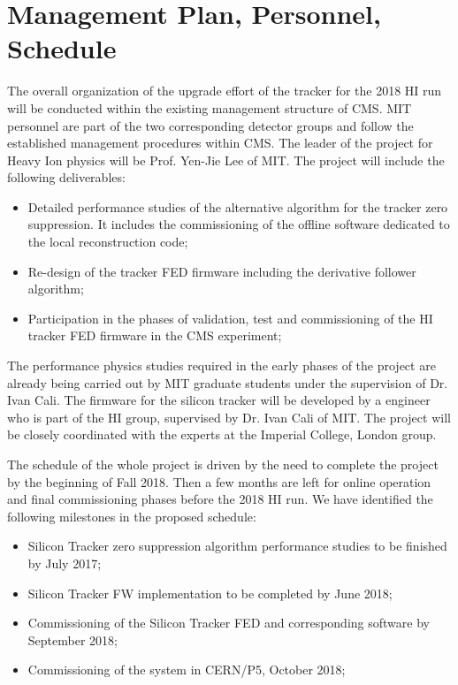 \section{Management Plan, Personnel, Schedule}
\label{sec:management}

The overall organization of the upgrade effort of the tracker%
for the 2018 HI run will be conducted within the existing management structure of CMS. MIT personnel are part of the two corresponding detector groups and follow the established management procedures within CMS. The leader of the project for Heavy Ion physics will be Prof. Yen-Jie Lee of MIT. The project will include the following deliverables:

\begin{itemize}
\item Detailed performance studies of the alternative algorithm for the tracker zero suppression. It includes the commissioning of the offline software dedicated to the local reconstruction code;
\item Re-design of the tracker FED firmware including the derivative follower algorithm;
\item Participation in the phases of validation, test and commissioning of the HI tracker FED firmware in the CMS experiment;
\end{itemize}

The performance physics studies required in the early phases of the project are already being carried out by MIT graduate students under the supervision of Dr. Ivan Cali. The firmware for the silicon tracker will be developed by a engineer who is part of the HI group, supervised by Dr. Ivan Cali of MIT. The project will be closely coordinated with the experts at the Imperial College, London group.

The schedule of the whole project is driven by the need to complete the project by the beginning of Fall 2018. Then a few months are left for online operation and final commissioning phases before the 2018 HI run. We have identified the following milestones in the proposed schedule:

\begin{itemize}
\item Silicon Tracker zero suppression algorithm performance studies to be finished by July 2017;
\item Silicon Tracker FW implementation to be completed by June 2018;
\item Commissioning of the Silicon Tracker FED and corresponding software by September 2018;
\item Commissioning of the system in CERN/P5, October 2018;
\end{itemize}
